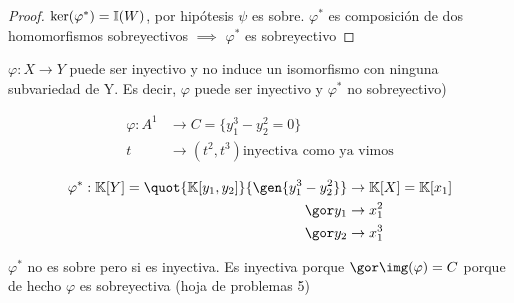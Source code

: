 \begin{proof}
	
	$\ker(\varphi^*)=\mathbb{I}(W)$, por hipótesis $\psi$ es sobre. $\varphi^*$ es composición de dos homomorfismos sobreyectivos $\implies$ $\varphi^*$ es sobreyectivo 
\end{proof}

\obs $\varphi: X \rightarrow Y$ puede ser inyectivo y no induce un isomorfismo con ninguna subvariedad de Y. Es decir, $\varphi$ puede ser inyectivo y $\varphi^*$ no sobreyectivo)

\begin{example}
	
	\begin{align*}
		\varphi: A^1 & \rightarrow C=\{ y_1^3-y_2^2=0 \} \\
		t & \rightarrow (t^2,t^3) \text{inyectiva como ya vimos}
	\end{align*}
	
	\begin{align*}
		\varphi^*: \K[Y]=\quot{\K[y_1,y_2]}{\gen{y_1^3-y_2^2}} & \rightarrow \K[X]=\K[x_1] \\
		\cls{y_1} & \rightarrow x_1^2 \\
		\cls{y_2} & \rightarrow x_1^3
	\end{align*}
	
	$\varphi^*$ no es sobre pero si es inyectiva. Es inyectiva porque $\cls{\img(\varphi)}=C$ porque de hecho $\varphi$ es sobreyectiva (hoja de problemas 5)
\end{example}
